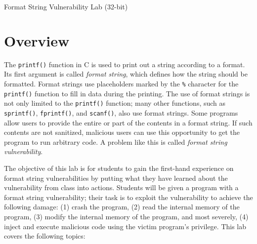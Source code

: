 
\newcommand{\commonfolder}{../../common-files}





\newcommand{\formatFigs}{./Figs}






\begin{center}
{\LARGE Format String Vulnerability Lab (32-bit)}
\end{center}




\section{Overview}


The \texttt{printf()} function in C is used to print out a string according to a format.  Its
first argument is called \textit{format string}, which defines how the string should be
formatted. Format strings use placeholders marked by the \texttt{\%} character for the
\texttt{printf()} function to fill in data during the printing.  The use of format strings is
not only limited to the \texttt{printf()} function; many other functions, such as
\texttt{sprintf()}, \texttt{fprintf()}, and \texttt{scanf()}, also use format strings. Some
programs allow users to provide the entire or part of the contents in a format string. If such
contents are not sanitized, malicious users can use this opportunity to get the program to run
arbitrary code. A problem like this is called \textit{format string vulnerability}.


The objective of this lab is for students to gain the first-hand
experience on format string vulnerabilities by putting what they have learned 
about the vulnerability from class into actions. 
Students will be given a program with a format string
vulnerability; their task is to exploit
the vulnerability to achieve the following damage: (1) crash the 
program, (2) read the internal memory of the program, (3) modify
the internal memory of the program, and most severely, 
(4) inject and execute malicious code using the victim program's privilege. 
This lab covers the following topics:

